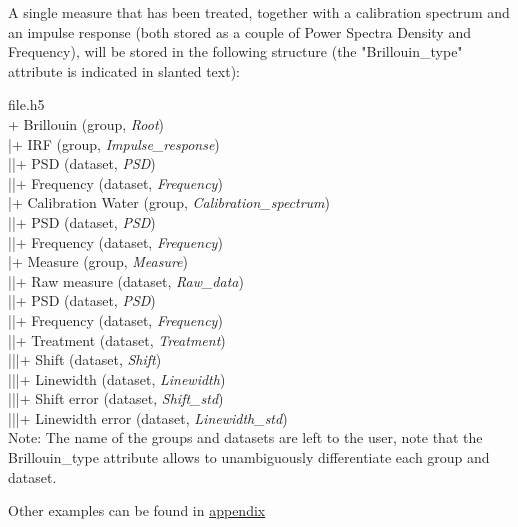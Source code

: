 A single measure that has been treated, together with a calibration spectrum and an impulse response (both stored as a couple of Power Spectra Density and Frequency), will be stored in the following structure (the "Brillouin\_type" attribute is indicated in slanted text):

\noindent file.h5\\
+ Brillouin (group, \textit{Root})\\
|\indent + IRF (group, \textit{Impulse\_response})\\
|\indent |\indent + PSD (dataset, \textit{PSD})\\
|\indent |\indent + Frequency (dataset, \textit{Frequency})\\
|\indent + Calibration Water (group, \textit{Calibration\_spectrum})\\
|\indent |\indent + PSD (dataset, \textit{PSD})\\
|\indent |\indent + Frequency (dataset, \textit{Frequency})\\
|\indent + Measure (group, \textit{Measure})\\
|\indent |\indent + Raw measure (dataset, \textit{Raw\_data})\\
|\indent |\indent + PSD (dataset, \textit{PSD})\\
|\indent |\indent + Frequency (dataset, \textit{Frequency})\\
|\indent |\indent + Treatment (dataset, \textit{Treatment})\\
|\indent |\indent |\indent + Shift (dataset, \textit{Shift})\\
|\indent |\indent |\indent + Linewidth (dataset, \textit{Linewidth})\\
|\indent |\indent |\indent + Shift error (dataset, \textit{Shift\_std})\\
|\indent |\indent |\indent + Linewidth error (dataset, \textit{Linewidth\_std})\\


Note: The name of the groups and datasets are left to the user, note that the Brillouin\_type attribute allows to unambiguously differentiate each group and dataset.

Other examples can be found in \hyperref[chap:examples_file_structures]{appendix}